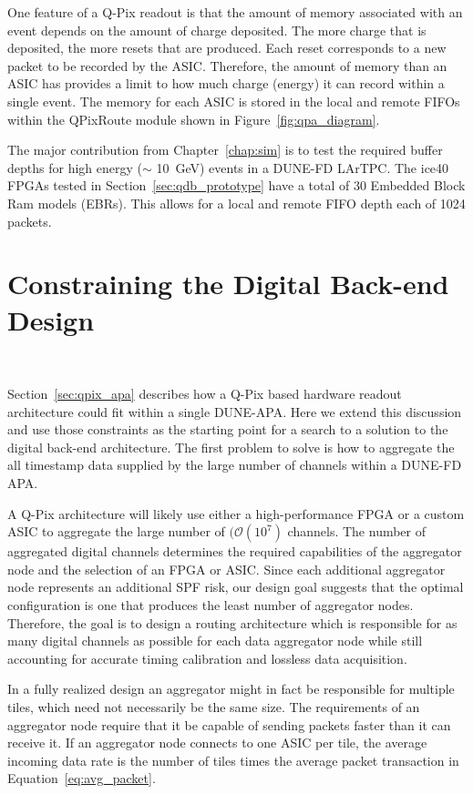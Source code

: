 One feature of a Q-Pix readout is that the amount of memory associated with an event depends on the amount of charge deposited.
The more charge that is deposited, the more resets that are produced.
Each reset corresponds to a new packet to be recorded by the ASIC.
Therefore, the amount of memory than an ASIC has provides a limit to how much charge (energy) it can record within a single event.
The memory for each ASIC is stored in the local and remote FIFOs within the QPixRoute module shown in Figure~\ref{fig:qpa_diagram}.

The major contribution from Chapter~\ref{chap:sim} is to test the required buffer depths for high energy ($\sim$ 10~\unit{GeV}) events in a DUNE-FD LArTPC.
The ice40 FPGAs tested in Section~\ref{sec:qdb_prototype} have a total of 30 Embedded Block Ram models (EBRs).
This allows for a local and remote FIFO depth each of 1024 packets.

\section{Constraining the Digital Back-end Design}~\label{sec:digital_constraints}

Section~\ref{sec:qpix_apa} describes how a Q-Pix based hardware readout architecture could fit within a single DUNE-APA.
Here we extend this discussion and use those constraints as the starting point for a search to a solution to the digital back-end architecture.
The first problem to solve is how to aggregate the all timestamp data supplied by the large number of channels within a DUNE-FD APA.

A Q-Pix architecture will likely use either a high-performance FPGA or a custom ASIC to aggregate the large number of $(\mathcal{O}(10^{7})$ channels.
The number of aggregated digital channels determines the required capabilities of the aggregator node and the selection of an FPGA or ASIC.
Since each additional aggregator node represents an additional SPF risk, our design goal suggests that the optimal configuration is one that produces the least number of aggregator nodes.
Therefore, the goal is to design a routing architecture which is responsible for as many digital channels as possible for each data aggregator node while still accounting for accurate timing calibration and lossless data acquisition.

In a fully realized design an aggregator might in fact be responsible for multiple tiles, which need not necessarily be the same size.
The requirements of an aggregator node require that it be capable of sending packets faster than it can receive it.
If an aggregator node connects to one ASIC per tile, the average incoming data rate is the number of tiles times the average packet transaction in Equation~\ref{eq:avg_packet}.

